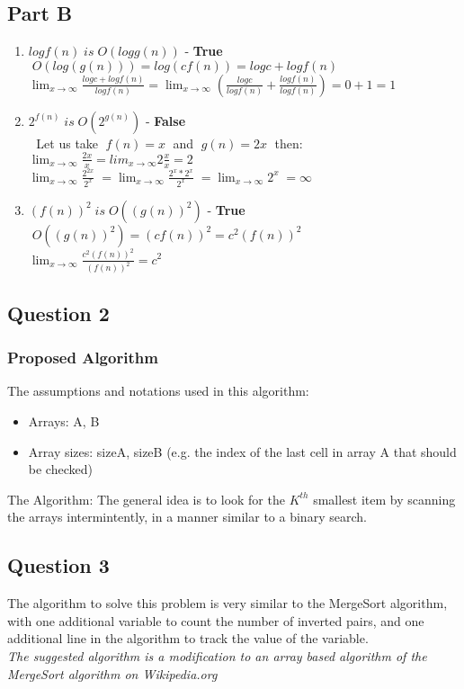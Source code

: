 \documentclass{article}
\begin{document}
\subsection*{Part B}
\begin{enumerate}
  \item $log {f(n)} \; is \; O(log {g(n)})$ - \textbf{True}
    \\ $\; O(log(g(n))) = log {(cf(n))} = log c + log {f(n)}$
	\\ $\lim_{x\to\infty}\frac{log c + log {f(n)}}{log {f(n)}} =
	    \lim_{x\to\infty}(\frac{log c}{log {f(n)}} + \frac{log {f(n)}}{log
	    {f(n)}}) = 0 + 1 = 1$
  \item $2^{f(n)} \; is \; O(2^{g(n)})$ - \textbf{False}
    \\ $\; $ Let us take $\; f(n) = x \;$ and $\; g(n) = 2x \;$ then:
    \\ $\lim_{x\to\infty}\frac{2x}{x} = lim_{x\to\infty}2\frac{x}{x} = 2$
    \\ $\lim_{x\to\infty}\frac{2^{2x}}{2^x} \; =
        \lim_{x\to\infty}\frac{2^x*2^x}{2^x} \; =
        \lim_{x\to\infty}{2^x} \; = \infty$
  \item $(f(n))^2 \; is \; O((g(n))^2)$ - \textbf{True}
    \\ $\; O((g(n))^2) = (cf(n))^2 = c^2(f(n))^2$
    \\ $\lim_{x\to\infty}\frac{c^2(f(n))^2}{(f(n))^2} = c^2$
\end{enumerate}
\vfill
\subsection*{Question 2}
\subsubsection*{Proposed Algorithm}
The assumptions and notations used in this algorithm:
\begin{itemize}
  \item Arrays: A, B
  \item Array sizes: sizeA, sizeB (e.g. the index of the last cell in array A
  that should be checked)
\end{itemize}

\raggedright The Algorithm: The general idea is to look for the $K^{th}$
smallest item by scanning the arrays intermintently, in a manner similar to a
binary search.\\
\vfill

\subsection*{Question 3}
The algorithm to solve this problem is very similar to the MergeSort algorithm,
with one additional variable to count the number of inverted pairs, and one
additional line in the algorithm to track the value of the variable.\\
\textit{The suggested algorithm is a modification to an array based algorithm
of the MergeSort algorithm on Wikipedia.org}\\
\end{document}
